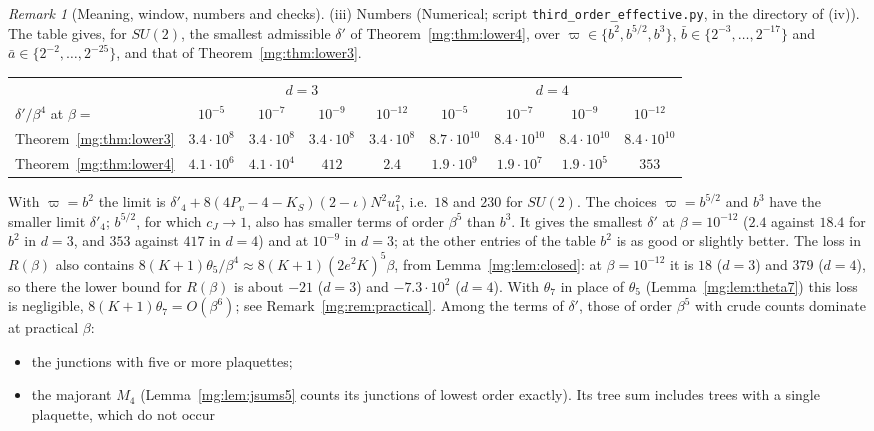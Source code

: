 \documentclass[11pt,a4paper]{article}
\theoremstyle{definition}
\theoremstyle{remark}
\newtheorem{remark}[theorem]{Remark}
\begin{document}
\begin{remark}[Meaning, window, numbers and checks]
(iii) Numbers (Numerical; script \texttt{third\_order\_effective.py}, in the directory of (iv)). The table gives, for $SU(2)$, the smallest admissible $\delta'$ of
Theorem~\ref{mg:thm:lower4}, over $\varpi\in\{b^2,b^{5/2},b^3\}$, $\bar b\in\{2^{-3},\dots,2^{-17}\}$ and $\bar a\in\{2^{-2},\dots,2^{-25}\}$, and that of
Theorem~\ref{mg:thm:lower3}.
\begin{center}
\small
\setlength{\tabcolsep}{4.5pt}
\begin{tabular}{@{}lcccccccc@{}}
\toprule
& \multicolumn{4}{c}{$d=3$} & \multicolumn{4}{c}{$d=4$}\\
$\delta'/\beta^4$ at $\beta=$ & $10^{-5}$ & $10^{-7}$ & $10^{-9}$ & $10^{-12}$ & $10^{-5}$ & $10^{-7}$ & $10^{-9}$ & $10^{-12}$\\
\midrule
Theorem~\ref{mg:thm:lower3} & $3.4\cdot10^8$ & $3.4\cdot10^8$ & $3.4\cdot10^8$ & $3.4\cdot10^8$ & $8.7\cdot10^{10}$ & $8.4\cdot10^{10}$ & $8.4\cdot10^{10}$ & $8.4\cdot10^{10}$\\
Theorem~\ref{mg:thm:lower4} & $4.1\cdot10^6$ & $4.1\cdot10^4$ & $412$ & $2.4$ & $1.9\cdot10^9$ & $1.9\cdot10^7$ & $1.9\cdot10^5$ & $353$\\
\bottomrule
\end{tabular}
\end{center}
With $\varpi=b^2$ the limit is $\delta'_4+8(4P_v-4-K_S)(2-\iota)N^2u_1^2$, i.e.\ $18$ and $230$ for $SU(2)$. The choices $\varpi=b^{5/2}$ and $b^3$ have the smaller limit $\delta'_4$; $b^{5/2}$, for which $c_J\to1$, also has
smaller terms of order $\beta^5$ than $b^3$. It gives the smallest $\delta'$ at $\beta=10^{-12}$ ($2.4$ against $18.4$ for $b^2$ in $d=3$, and $353$ against $417$ in $d=4$) and
at $10^{-9}$ in $d=3$; at the other entries of the table $b^2$ is as good or slightly better. The loss in $R(\beta)$ also contains
$8(K+1)\theta_5/\beta^4\approx8(K+1)(2e^2K)^5\beta$, from Lemma~\ref{mg:lem:closed}: at $\beta=10^{-12}$ it is $18$ ($d=3$) and $379$ ($d=4$), so there the lower bound for $R(\beta)$ is
about $-21$ ($d=3$) and $-7.3\cdot10^2$ ($d=4$). With $\theta_7$ in place of $\theta_5$ (Lemma~\ref{mg:lem:theta7}) this loss is negligible, $8(K+1)\theta_7=O(\beta^6)$; see
Remark~\ref{mg:rem:practical}. Among the terms of $\delta'$, those of order $\beta^5$ with crude counts dominate at practical $\beta$:
\begin{itemize}
\item the junctions with five or more plaquettes;
\item the majorant $M_4$ (Lemma~\ref{mg:lem:jsums5} counts its junctions of lowest order exactly). Its tree sum includes trees with a single plaquette, which do not occur

\end{itemize}
\end{remark}
\end{document}
